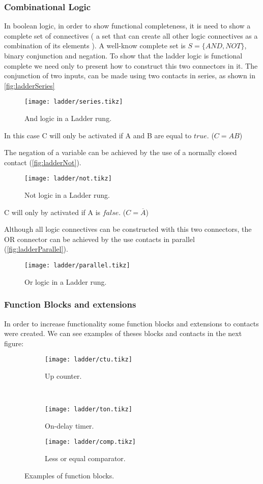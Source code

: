 \subsubsection{Combinational Logic}
In boolean logic, in order to show functional completeness, it is need to show a
complete set of connectives ( a set that can create all other logic connectives
as a combination of its elements ). A well-know complete set is $S=\{AND,NOT\}$,
binary conjunction and negation.
To show that the ladder logic is functional complete we need only to present how
to construct this two connectors in it.
The conjunction of two inputs, can be made using two contacts in series, as
shown in \autoref{fig:ladderSeries}
\begin{figure}[H]
  \centering \texttt{[image: ladder/series.tikz]}
  \caption{And logic in a Ladder rung.}
  \label{fig:ladderSeries}
\end{figure}
In this case C will only be activated if A and B are equal to $true$. ($C=AB$)

The negation of a variable can be achieved by the use of a normally closed
contact (\autoref{fig:ladderNot}).
\begin{figure}[H]
  \centering \texttt{[image: ladder/not.tikz]}
  \caption{Not logic in a Ladder rung.}
  \label{fig:ladderNot}
\end{figure}
C will only by activated if A is $false$. ($C=\overline{A}$)

Although all logic connectives can be constructed with this two connectors, the
OR connector can be achieved by the use contacts in parallel (\autoref{fig:ladderParallel}).
\begin{figure}[H]
  \centering \texttt{[image: ladder/parallel.tikz]}
  \caption{Or logic in a Ladder rung.}
  \label{fig:ladderParallel}
\end{figure}



\subsubsection{Function Blocks and extensions}
In order to increase functionality some function blocks and 
extensions to contacts were created. We can see examples of theses blocks and
contacts in the next figure:

\begin{figure}[H]
   \centering
\begin{subfigure}[t]{0.45\textwidth}
  \centering \texttt{[image: ladder/ctu.tikz]}
  \caption{Up counter.}
  \label{fig:ctu}
\end{subfigure}
~
\begin{subfigure}[t]{0.45\textwidth}
  \centering \texttt{[image: ladder/ton.tikz]}
  \caption{On-delay timer.}
  \label{fig:ton}
\end{subfigure}

\begin{subfigure}[t]{0.45\textwidth}
  \centering \texttt{[image: ladder/comp.tikz]}
  \caption{Less or equal comparator.}
  \label{fig:comp}
\end{subfigure}
  \caption{Examples of function blocks.}
  \label{fig:functionBlocks}
\end{figure}

